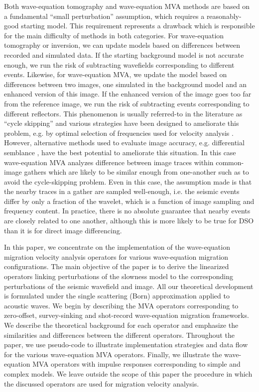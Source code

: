 Both wave-equation tomography and wave-equation MVA methods are based
on a fundamental ``small perturbation'' assumption, which requires a
reasonably-good starting model. This requirement represents a drawback
which is responsible for the main difficulty of methods in both
categories. For wave-equation tomography or inversion, we can update
models based on differences between recorded and simulated data. If
the starting background model is not accurate enough, we run the risk
of subtracting wavefields corresponding to different events. Likewise,
for wave-equation MVA, we update the model based on differences
between two images, one simulated in the background model and an
enhanced version of this image. If the enhanced version of the image
goes too far from the reference image, we run the risk of subtracting
events corresponding to different reflectors. This phenomenon is
usually referred-to in the literature as ``cycle skipping'' and
various strategies have been designed to ameliorate this problem,
e.g. by optimal selection of frequencies used for velocity analysis
\cite[]{GEO69-01-02310248,AlbertinFreq}. However, alternative methods
used to evaluate image accuracy, e.g. differential semblance
\cite[]{GEO56-05-06540663,SEG-2003-21322135}, have the best potential
to ameliorate this situation. In this case wave-equation MVA analyzes
difference between image traces within common-image gathers which are
likely to be similar enough from one-another such as to avoid the
cycle-skipping problem. Even in this case, the assumption made is that
the nearby traces in a gather are sampled well-enough, i.e. the
seismic events differ by only a fraction of the wavelet, which is a
function of image sampling and frequency content. In practice, there
is no absolute guarantee that nearby events are closely related to one
another, although this is more likely to be true for DSO than it is
for direct image differencing.


In this paper, we concentrate on the implementation of the
wave-equation migration velocity analysis operators for various
wave-equation migration configurations. The main objective of the
paper is to derive the linearized operators linking perturbations of
the slowness model to the corresponding perturbations of the seismic
wavefield and image. All our theoretical development is formulated
under the single scattering (Born) approximation applied to acoustic
waves. We begin by describing the MVA operators corresponding to
zero-offset, survey-sinking and shot-record wave-equation migration
frameworks.  We describe the theoretical background for each operator
and emphasize the similarities and differences between the different
operators.  Throughout the paper, we use pseudo-code to illustrate
implementation strategies and data flow for the various wave-equation
MVA operators. Finally, we illustrate the wave-equation MVA operators
with impulse responses corresponding to simple and complex models. We
leave outside the scope of this paper the procedure in which the
discussed operators are used for migration velocity analysis.
